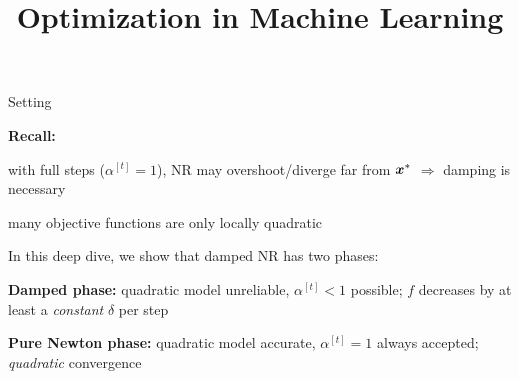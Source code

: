 \documentclass[11pt,compress,t,notes=noshow, xcolor=table]{beamer}
\title{Optimization in Machine Learning}
\begin{document}

\begin{framei}{Setting}
\item \textbf{Recall:}
\begin{itemizeM}
\item with full steps ($\alpha^{[t]} = 1$), NR may overshoot/diverge far from
$\bm{x}^\ast$ $\Rightarrow$ damping is necessary
\item many objective functions are only locally quadratic
\end{itemizeM}
\item In this deep dive, we show that damped NR has two phases:
\begin{itemizeM}
\item \textbf{Damped phase:} quadratic model unreliable, $\alpha^{[t]} < 1$ possible; $f$ decreases by at least a
\textit{constant} $\delta$ per step
\item \textbf{Pure Newton phase:} quadratic model accurate, $\alpha^{[t]} = 1$ always accepted; \textit{quadratic} convergence
\end{itemizeM}
\end{framei}
\end{document}
